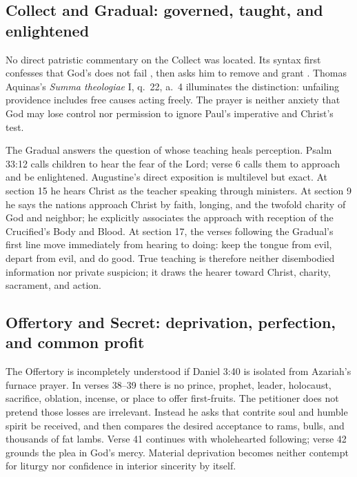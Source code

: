 \begin{deepstudy}
\sectionguard
\subsection*{Collect and Gradual: governed, taught, and enlightened\enspace{}}

No direct patristic commentary on the Collect was located. Its syntax first confesses that God's  does not fail , then asks him to remove  and grant . Thomas Aquinas's \emph{Summa theologiae} I, q.~22, a.~4 illuminates the distinction: unfailing providence includes free causes acting freely. The prayer is neither anxiety that God may lose control nor permission to ignore Paul's imperative and Christ's test.

The Gradual answers the question of whose teaching heals perception. Psalm 33:12 calls children to hear the fear of the Lord; verse 6 calls them to approach and be enlightened. Augustine's direct exposition is multilevel but exact. At section 15 he hears Christ as the teacher speaking through ministers. At section 9 he says the nations approach Christ by faith, longing, and the twofold charity of God and neighbor; he explicitly associates the approach with reception of the Crucified's Body and Blood. At section 17, the verses following the Gradual's first line move immediately from hearing to doing: keep the tongue from evil, depart from evil, and do good. True teaching is therefore neither disembodied information nor private suspicion; it draws the hearer toward Christ, charity, sacrament, and action.

\sectionguard
\subsection*{Offertory and Secret: deprivation, perfection, and common profit\enspace{}}

The Offertory is incompletely understood if Daniel 3:40 is isolated from Azariah's furnace prayer. In verses 38--39 there is no prince, prophet, leader, holocaust, sacrifice, oblation, incense, or place to offer first-fruits. The petitioner does not pretend those losses are irrelevant. Instead he asks that contrite soul and humble spirit be received, and then compares the desired acceptance to rams, bulls, and thousands of fat lambs. Verse 41 continues with wholehearted following; verse 42 grounds the plea in God's mercy. Material deprivation becomes neither contempt for liturgy nor confidence in interior sincerity by itself.


\end{deepstudy}
